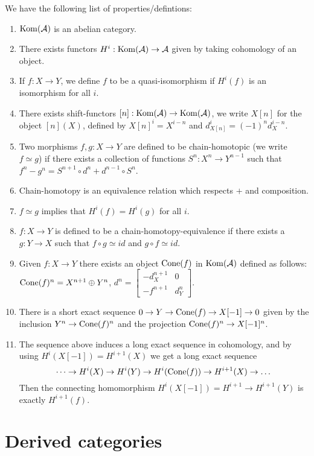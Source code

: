 \documentclass[a4paper, UKenglish]{report}
\begin{document}
We have the following list of properties/defintions:
\begin{enumerate}
\item $\operatorname{Kom}(\mathcal{A})$ is an abelian category.
\item There exists functors $H^i: \operatorname{Kom}(\mathcal{A}) \to \mathcal{A}$ given by taking cohomology of an object.
\item If $f:X \to Y$, we define $f$ to be a quasi-isomorphism if $H^i(f)$ is an isomorphism for all $i$.
\item There exists shift-functors $[n]: \operatorname{Kom}(\mathcal{A}) \to \operatorname{Kom}(\mathcal{A})$, we write $X[n]$ for the object $[n](X)$, defined by $X[n]^i=X^{i-n}$ and $d_{X[n]}^i = (-1)^n d_X^{i-n}$.
\item Two morphisms $f,g: X \to Y$ are defined to be chain-homotopic (we write $f \simeq g$) if there exists a collection of functions $S^n:X^n \to Y^{n-1}$ such that $f^n-g^n=S^{n+1} \circ d^n + d^{n-1} \circ S^n$.
\item Chain-homotopy is an equivalence relation which respects $+$ and composition.
\item $f \simeq g$ implies that $H^i(f)=H^i(g)$ for all $i$.
\item $f:X \to Y$ is defined to be a chain-homotopy-equivalence if there exists a $g: Y \to X$ such that $f \circ g \simeq id$ and $g \circ f \simeq id$.
\item Given $f: X \to Y$ there exists an object $\operatorname{Cone}(f)$ in $\operatorname{Kom}(\mathcal{A})$ defined as follows: $\operatorname{Cone}(f)^n = X^{n+1} \oplus Y^n$, $d^n = \begin{bmatrix} -d_X^{n+1} & 0 \\ -f^{n+1} & d_Y^n \end{bmatrix}$.
\item There is a short exact sequence $0 \to Y \to \operatorname{Cone}(f) \to X[-1] \to 0$ given by the inclusion $Y^n \to \operatorname{Cone}(f)^n$ and the projection $\operatorname{Cone}(f)^n \to X[-1]^n$.
\item The sequence above induces a long exact sequence in cohomology, and by using $H^i(X[-1])=H^{i+1}(X)$ we get a long exact sequence
\[ \cdots \to H^i(X) \to H^i(Y) \to H^i(\operatorname{Cone}(f)) \to H^{i+1}(X) \to \dots \]
Then the connecting homomorphism $H^i(X[-1])=H^{i+1} \to H^{i+1}(Y)$ is exactly $H^{i+1}(f)$.
\end{enumerate}

\section{Derived categories}
\end{document}
